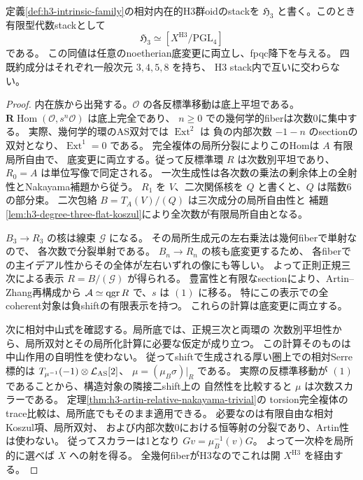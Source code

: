 \begin{theorem}\label{thm:h3-intrinsic-algebraic-stack}
定義\ref{def:h3-intrinsic-family}の相対内在的H3群oidのstackを
$\mathfrak H_3$ と書く。このとき有限型代数stackとして
\[
 \mathfrak H_3\simeq[X^{\mathrm{H3}}/\mathrm{PGL}_4]
\]
である。
この同値は任意のnoetherian底変更に両立し、fpqc降下を与える。
四既約成分はそれぞれ一般次元 $3,4,5,8$ を持ち、
H3 stack内で互いに交わらない。
\end{theorem}
\begin{proof}
内在族から出発する。$\mathcal O$ の各反標準移動は底上平坦である。
$\mathbf R\operatorname{Hom}(\mathcal O,s^n\mathcal O)$ は底上完全であり、
$n\ge0$ での幾何学的fiberは次数0に集中する。
実際、幾何学的環のAS双対では $\operatorname{Ext}^2$ は
負の内部次数 $-1-n$ のsectionの双対となり、$\operatorname{Ext}^1=0$ である。
完全複体の局所分裂によりこのHomは $A$ 有限局所自由で、
底変更に両立する。従って反標準環 $R$ は次数別平坦であり、
$R_0=A$ は単位写像で同定される。
一次生成性は各次数の乗法の剰余体上の全射性とNakayama補題から従う。
$R_1$ を $V$、二次関係核を $Q$ と書くと、$Q$ は階数6の部分束。
二次包絡 $B=T_A(V)/(Q)$ は三次成分の局所自由性と
補題\ref{lem:h3-degree-three-flat-koszul}により全次数が有限局所自由となる。

$B_3\to R_3$ の核は線束 $\mathcal G$ になる。
その局所生成元の左右乗法は幾何fiberで単射なので、
各次数で分裂単射である。
$B_n\to R_n$ の核も底変更するため、
各fiberでの主イデアル性からその全体が左右いずれの像にも等しい。
よって正則正規三次による表示 $R=B/(\mathcal G)$ が得られる。
豊富性と有限なsectionにより、Artin--Zhang再構成から
$\mathcal A\simeq\operatorname{qgr} R$ で、$s$ は $(1)$ に移る。
特にこの表示での全coherent対象は負shiftの有限表示を持つ。
これらの計算は底変更に両立する。

次に相対中山式を確認する。局所底では、正規三次と両環の
次数別平坦性から、局所双対とその局所化計算に必要な仮定が成り立つ。
この計算そのものは中山作用の自明性を使わない。
従ってshiftで生成される厚い圏上での相対Serre標的は
$T_{\mu^{-1}}(-1)\otimes\mathcal L_{\rm AS}[2]$、
$\mu=(\mu_B\sigma)|_R$ である。
実際の反標準移動が $(1)$ であることから、構造対象の隣接二shift上の
自然性を比較すると $\mu$ は次数スカラーである。
定理\ref{thm:h3-artin-relative-nakayama-trivial}の
torsion完全複体のtrace比較は、局所底でもそのまま適用できる。
必要なのは有限自由な相対Koszul項、局所双対、
および内部次数0における恒等射の分裂であり、Artin性は使わない。
従ってスカラーは1となり $Gv=\mu_B^{-1}(v)G$。
よって一次枠を局所的に選べば $X$ への射を得る。
全幾何fiberがH3なのでこれは開 $X^{\mathrm{H3}}$ を経由する。


\end{proof}
